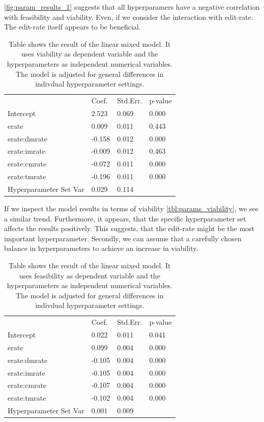 \documentclass[./../../paper.tex]{subfiles}
\begin{document}
\autoref{fig:param_results_1} suggests that all hyperparamers have a negative correlation with feasibility and viability. Even, if we consider the interaction with edit-rate. The edit-rate itself appears to be beneficial. 


\begin{table}
    \caption{Table shows the result of the linear mixed model. It uses viability as dependent variable and the hyperparameters as independent numerical variables. The model is adjusted for general differences in indivdual hyperparameter settings.}
    \label{tbl:params_viability}
    \begin{tabular}{llll}
                               & Coef.  & Std.Err. & p-value \\
        Intercept              & 2.523  & 0.069    & 0.000   \\
        erate                  & 0.009  & 0.011    & 0.443   \\
        erate:dmrate           & -0.158 & 0.012    & 0.000   \\
        erate:imrate           & -0.009 & 0.012    & 0.463   \\
        erate:cmrate           & -0.072 & 0.011    & 0.000   \\
        erate:tmrate           & -0.196 & 0.011    & 0.000   \\
        Hyperparameter Set Var & 0.029  & 0.114    &         \\
    \end{tabular}
\end{table}

If we inspect the model results in terms of viability \autoref{tbl:params_viability}, we see a similar trend. Furthermore, it appears, that the specific hyperparameter set affects the results positively. This suggests, that the edit-rate might be the most important hyperparameter. Secondly, we can assume that a carefully chosen balance in hyperparameters to achieve an increase in viability.   

\begin{table}
    \caption{Table shows the result of the linear mixed model. It uses feasibility as dependent variable and the hyperparameters as independent numerical variables. The model is adjusted for general differences in indivdual hyperparameter settings.}
    \label{tbl:params_feasibility}
    \begin{tabular}{llll}
     & Coef. & Std.Err. & p-value \\
    Intercept & 0.022 & 0.011 & 0.041 \\
    erate & 0.099 & 0.004 & 0.000 \\
    erate:dmrate & -0.105 & 0.004 & 0.000 \\
    erate:imrate & -0.105 & 0.004 & 0.000 \\
    erate:cmrate & -0.107 & 0.004 & 0.000 \\
    erate:tmrate & -0.102 & 0.004 & 0.000 \\
    Hyperparameter Set Var & 0.001 & 0.009 &  \\
    \end{tabular}
\end{table}
\end{document}
